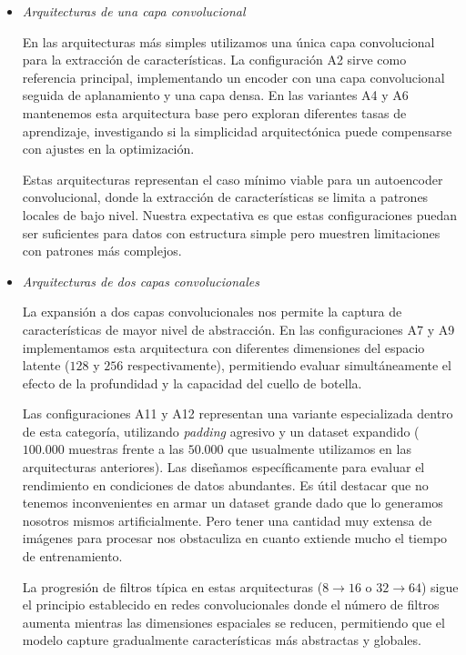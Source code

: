 \begin{itemize}
    \item \emph{Arquitecturas de una capa convolucional}

    En las arquitecturas más simples utilizamos una única capa convolucional para la extracción de características. La configuración A2 sirve como referencia principal, implementando un encoder con una capa convolucional seguida de aplanamiento y una capa densa. En las variantes A4 y A6 mantenemos esta arquitectura base pero exploran diferentes tasas de aprendizaje, investigando si la simplicidad arquitectónica puede compensarse con ajustes en la optimización.
    
    Estas arquitecturas representan el caso mínimo viable para un autoencoder convolucional, donde la extracción de características se limita a patrones locales de bajo nivel. Nuestra expectativa es que estas configuraciones puedan ser suficientes para datos con estructura simple pero muestren limitaciones con patrones más complejos.
    
    \item \emph{Arquitecturas de dos capas convolucionales}
    
    La expansión a dos capas convolucionales nos permite la captura de características de mayor nivel de abstracción. En las configuraciones A7 y A9 implementamos esta arquitectura con diferentes dimensiones del espacio latente ($128$ y $256$ respectivamente), permitiendo evaluar simultáneamente el efecto de la profundidad y la capacidad del cuello de botella.
    
    Las configuraciones A11 y A12 representan una variante especializada dentro de esta categoría, utilizando \emph{padding} agresivo y un dataset expandido ($100.000$ muestras frente a las $50.000$ que usualmente utilizamos en las arquitecturas anteriores). Las diseñamos específicamente para evaluar el rendimiento en condiciones de datos abundantes. Es útil destacar que no tenemos inconvenientes en armar un dataset grande dado que lo generamos nosotros mismos artificialmente. Pero tener una cantidad muy extensa de imágenes para procesar nos obstaculiza en cuanto extiende mucho el tiempo de entrenamiento.
    
    La progresión de filtros típica en estas arquitecturas ($8\rightarrow 16$ o $32\rightarrow 64$) sigue el principio establecido en redes convolucionales donde el número de filtros aumenta mientras las dimensiones espaciales se reducen, permitiendo que el modelo capture gradualmente características más abstractas y globales.
    

\end{itemize}
